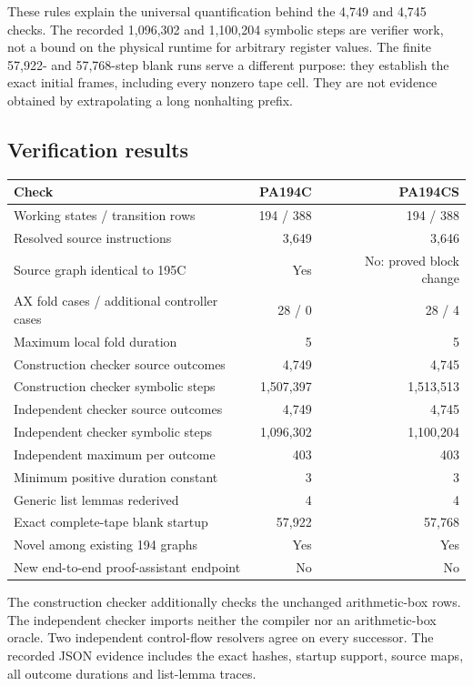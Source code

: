 \documentclass[11pt,letterpaper]{article}
\begin{document}
These rules explain the universal quantification behind the 4,749 and
4,745 checks. The recorded 1,096,302 and 1,100,204 symbolic steps are verifier work, not a
bound on the physical runtime for arbitrary register values. The finite
57,922- and 57,768-step blank runs serve a different purpose: they establish
the exact initial frames, including every nonzero tape cell. They are not
evidence obtained by extrapolating a long nonhalting prefix.

\subsection{Verification results}

\begin{center}
\begin{tabular}{@{}lrr@{}}
\toprule Check & PA194C & PA194CS\\
\midrule
Working states / transition rows &194 / 388&194 / 388\\
Resolved source instructions &3,649&3,646\\
Source graph identical to 195C &Yes&No: proved block change\\
AX fold cases / additional controller cases &28 / 0&28 / 4\\
Maximum local fold duration &5&5\\
Construction checker source outcomes &4,749&4,745\\
Construction checker symbolic steps &1,507,397&1,513,513\\
Independent checker source outcomes &4,749&4,745\\
Independent checker symbolic steps &1,096,302&1,100,204\\
Independent maximum per outcome &403&403\\
Minimum positive duration constant &3&3\\
Generic list lemmas rederived &4&4\\
Exact complete-tape blank startup &57,922&57,768\\
Novel among existing 194 graphs &Yes&Yes\\
New end-to-end proof-assistant endpoint &No&No\\
\bottomrule
\end{tabular}
\end{center}
The construction checker additionally checks the unchanged arithmetic-box
rows. The independent checker imports neither the compiler nor an
arithmetic-box oracle. Two independent control-flow resolvers agree on
every successor. The recorded JSON evidence includes the exact hashes,
startup support, source maps, all outcome durations and list-lemma traces.
\end{document}
